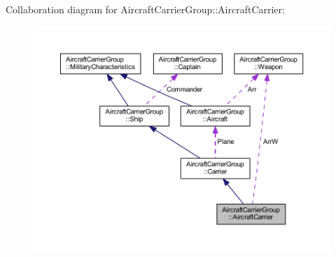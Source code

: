 Collaboration diagram for Aircraft\+Carrier\+Group\+:\+:Aircraft\+Carrier\+:
\nopagebreak
\begin{figure}[H]
\begin{center}
\leavevmode
\includegraphics[width=350pt]{class_aircraft_carrier_group_1_1_aircraft_carrier__coll__graph}
\end{center}
\end{figure}
